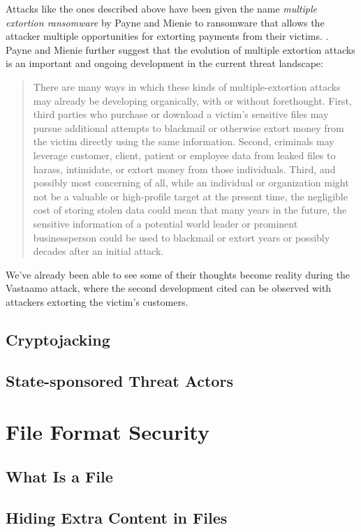 Attacks like the ones described above have been given the name \emph{multiple extortion ransomware} by Payne and
Mienie to ransomware that allows the attacker multiple opportunities for extorting payments from their victims.
\cite{multiple-extortion-ransomware}.
Payne and Mienie further suggest that the evolution of multiple extortion attacks is an important and ongoing
development in the current threat landscape:
\begin{quote}
  There are many ways in which these kinds of multiple-extortion attacks may already be developing organically,
  with or without forethought. First, third parties who purchase or download a victim's sensitive files may pursue
  additional attempts to blackmail or otherwise extort money from the victim directly using the same information.
  Second, criminals may leverage customer, client, patient or employee data from leaked files to harass,
  intimidate, or extort money from those individuals. Third, and possibly most concerning of all, while an individual
  or organization might not be a valuable or high-profile target at the present time, the negligible cost of storing
  stolen data could mean that many years in the future, the sensitive information of a potential world leader or
  prominent businessperson could be used to blackmail or extort years or possibly decades after an initial attack.
  \cite{multiple-extortion-ransomware} %
\end{quote}
We've already been able to see some of their thoughts become reality during the Vastaamo attack, where the second
development cited can be observed with attackers extorting the victim's customers.

\subsection{Cryptojacking}
\subsection{State-sponsored Threat Actors}


\section{File Format Security}
\subsection{What Is a File}
\subsection{Hiding Extra Content in Files}
